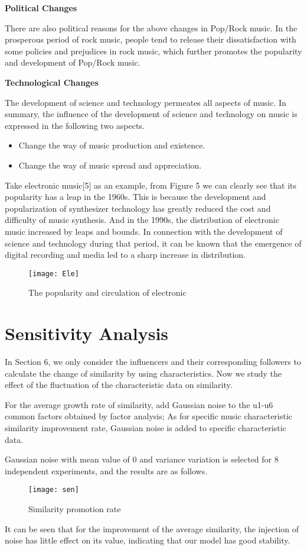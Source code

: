 \documentclass{mcmthesis}
\newcommand{\upcite}[1]{\textsuperscript{\textsuperscript{ \cite{#1}}}}
\begin{document}
\noindent%
\textbf{Political Changes}

There are also political reasons\upcite{4} for the above changes in Pop/Rock music. In the prosperous period of rock music, people tend to release their dissatisfaction with some policies and prejudices in rock music, which further promotes the popularity and development of Pop/Rock music.


\noindent%
\textbf{Technological Changes}
 
The development of science and technology permeates all aspects of music. In summary, the influence of the development of science and technology on music is expressed in the following two aspects.
\begin{itemize}
	\item Change the way of music production and existence.
	\item Change the way of music spread and appreciation.
\end{itemize}
Take electronic music[5] as an example, from Figure 5 we can clearly see that its popularity has a leap in the 1960s. This is because the development and popularization of synthesizer technology has greatly reduced the cost and difficulty of music synthesis. And in the 1990s, the distribution of electronic music increased by leaps and bounds. In connection with the development of science and technology during that period, it can be known that the emergence of digital recording and media led to a sharp increase in distribution.
\begin{figure}[H]%
	\small
	\centering
	\texttt{[image: Ele]}%
	\caption{The popularity and circulation of electronic}\label{fig:7}%
\end{figure}
\section{Sensitivity Analysis}
In Section 6, we only consider the influencers and their corresponding followers to calculate the change of similarity by using characteristics. Now we study the effect of the fluctuation of the characteristic data on similarity.

 For the average growth rate of similarity, add Gaussian noise to the u1-u6 common factors obtained by factor analysis;
As for specific music characteristic similarity improvement rate, Gaussian noise is added to specific characteristic data.

Gaussian noise with mean value of 0 and variance variation is selected for 8 independent experiments, and the results are as follows.
\begin{figure}[H]%
	\small
	\centering
	\texttt{[image: sen]}%
	\caption{Similarity promotion rate}\label{fig:7}%
\end{figure}
It can be seen that for the improvement of the average similarity, the injection of noise has little effect on its value, indicating that our model has good stability.
\end{document}
